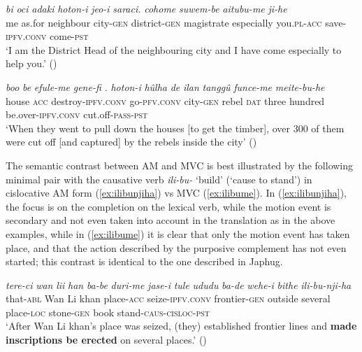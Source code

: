 \documentclass{article}
\newcommand{\ipa}[1]{\textit{{\phon\mbox{#1}}}} %
\begin{document}
\begin{exe}
\ex \label{ex:aitubume}
\gll
\ipa{bi}	\ipa{oci}	\ipa{adaki}	\ipa{hoton-i}	\ipa{jeo-i}	\ipa{saraci.}	\ipa{cohome}	\ipa{suwem-be}	\ipa{aitubu-me}	\ipa{ji-he} \\
me as.for neighbour city-\textsc{gen} district-\textsc{gen} magistrate especially you.\textsc{pl}-\textsc{acc} save-\textsc{ipfv.conv} come-\textsc{pst} \\
‘I am the District Head of the neighbouring city and I have come especially to help you.’ (\citealt[397;291]{stary83sakda})
\end{exe}

\begin{exe}
\ex \label{ex:efuleme}
\gll
 \ipa{boo} 	\ipa{be} 	\ipa{efule-me} 	\ipa{gene-fi} 	\ipa{.} 	\ipa{hoton-i} 	\ipa{hûlha} 	\ipa{de} 	\ipa{ilan} 	\ipa{tanggû} 	\ipa{funce-me} 	\ipa{meite-bu-he} \\
 house \textsc{acc} destroy-\textsc{ipfv.conv} go-\textsc{pfv.conv} { } city-\textsc{gen} rebel \textsc{dat} three hundred be.over-\textsc{ipfv.conv} cut.off-\textsc{pass-pst} \\
 \glt ‘When they went to pull down the houses [to get the timber], over 300 of them were cut off [and captured] by the rebels inside the city’ (\citealt[69/97]{cosmo06dzengseo})
\end{exe}

 

The semantic contrast between AM and MVC is best illustrated by the following minimal pair with the causative verb \ipa{ili-bu-} `build' (`cause to stand') in cislocative AM form (\ref{ex:ilibunjiha}) vs MVC (\ref{ex:ilibume}). In (\ref{ex:ilibunjiha}), the focus is on the completion on the lexical verb, while the motion event is secondary and not even taken into account in the translation as in the above examples, while in (\ref{ex:ilibume}) it is clear that only the motion event has taken place, and that the action described by the purposive complement has not even started; this contrast is identical to the one described in Japhug.

\begin{exe}
\ex \label{ex:ilibunjiha}
\gll
\ipa{tere-ci} 	\ipa{wan} 	\ipa{lii} 	\ipa{han} 	\ipa{ba-be} 	\ipa{duri-me} 	\ipa{jase-i} 	\ipa{tule} 	\ipa{ududu} 	\ipa{ba-de} 	\ipa{wehe-i} 	\ipa{bithe} 	\ipa{ili-bu-nji-ha} \\
that-\textsc{abl} Wan Li khan place-\textsc{acc} seize-\textsc{ipfv.conv} frontier-\textsc{gen} outside several place-\textsc{loc} stone-\textsc{gen} book stand-\textsc{caus-cisloc-pst} \\
\glt ‘After Wan Li khan’s place was seized, (they) established frontier lines and \textbf{made inscriptions be erected} on several places.’ (\citealt[129-130;46]{shunjuu92yargiyan})
\end{exe}
\end{document}
